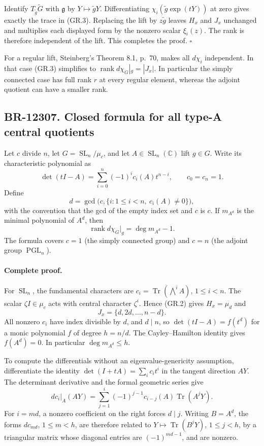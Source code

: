 Identify $T_{\widetilde g}\widetilde G$ with $\mathfrak g$ by
$Y\mapsto\widetilde gY$.  Differentiating
$\chi_i(\widetilde g\exp(tY))$ at zero gives exactly the trace
in (GR.3).  Replacing the lift by $z\widetilde g$ leaves $H_x$
and $J_x$ unchanged and multiplies each displayed form by the
nonzero scalar $\xi_i(z)$.  The rank is therefore independent
of the lift.  This completes the proof. \(\square\)

For a regular lift, Steinberg's Theorem 8.1, p.~70, makes all
$d\chi_i$ independent.  In that case (GR.3) simplifies to
$\operatorname{rank}d\chi_G|_g=|J_x|$.  In particular the
simply connected case has full rank $r$ at every regular element,
whereas the adjoint quotient can have a smaller rank.

\subsection{BR-12307. Closed formula for all type-A central quotients}
Let $c$ divide $n$, let $G=\operatorname{SL}_n/\mu_c$, and let
$A\in\operatorname{SL}_n(\mathbb C)$ lift $g\in G$.
Write its characteristic polynomial as
\[
 \det(tI-A)=\sum_{i=0}^{n}(-1)^i c_i(A)t^{n-i},
 \qquad c_0=c_n=1.
\]
Define
\[
 d=\gcd\bigl(c,\{i:1\leq i<n,\ c_i(A)\ne0\}\bigr),
 \tag{GR.4}
\]
with the convention that the gcd of the empty index set and $c$
is $c$.  If $m_{A^d}$ is the minimal polynomial of $A^d$, then
\[
 \boxed{\operatorname{rank}d\chi_G|_g
        =\deg m_{A^d}-1.}
 \tag{GR.5}
\]
The formula covers $c=1$ (the simply connected group) and $c=n$
(the adjoint group $\operatorname{PGL}_n$).

\paragraph{Complete proof.}
For $\operatorname{SL}_n$, the fundamental characters are
$c_i=\operatorname{Tr}(\bigwedge^i A)$, $1\leq i<n$.
The scalar $\zeta I\in\mu_c$ acts with central character
$\zeta^i$.  Hence (GR.2) gives $H_x=\mu_d$ and
\[
 J_x=\{d,2d,\ldots,n-d\}.
\]
All nonzero $c_i$ have index divisible by $d$, and $d\mid n$,
so $\det(tI-A)=f(t^d)$ for a monic polynomial $f$ of degree
$h=n/d$.  The Cayley--Hamilton identity gives $f(A^d)=0$.
In particular $\deg m_{A^d}\leq h$.

To compute the differentials without an eigenvalue-genericity
assumption, differentiate the identity
$\det(I+tA)=\sum_i c_i t^i$ in the tangent direction $AY$.
The determinant derivative and the formal geometric series give
\[
 dc_i|_A(AY)=\sum_{j=1}^{i}(-1)^{j-1}c_{i-j}(A)
                                  \operatorname{Tr}(A^jY).
 \tag{GR.6}
\]
For $i=md$, a nonzero coefficient on the right forces $d\mid j$.
Writing $B=A^d$, the forms $dc_{md}$, $1\leq m<h$, are
therefore related to
$Y\mapsto\operatorname{Tr}(B^jY)$, $1\leq j<h$, by a
triangular matrix whose diagonal entries are
$(-1)^{md-1}$, and are nonzero.

